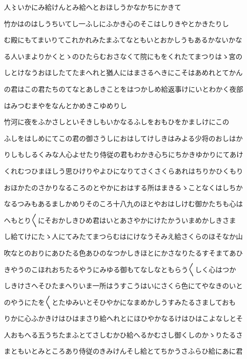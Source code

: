 \documentclass[a4paper,11pt,landscape]{ltjtarticle}
\begin{document}
人〻いかにみ給けんとみ給へとおほしうかなかちにかきて
\par\medskip
竹かはのはしうちいてし一ふしにふかき心のそこはしりきやとかきたりし
\par\medskip
む殿にもてまいりてこれかれみたまふてなともいとおかしうもあるかないかな
\par\medskip
る人いまよりかくとゝのひたらむおさなくて院にもをくれたてまつりはゝ宮の
\par\medskip
しとけなうおほしたてたまへれと猶人にはまさるへきにこそはあめれとてかん
\par\medskip
の君はこの君たちのてなとあしきことをはつかしめ給返事けにいとわかく夜部
\par\medskip
はみつむまやをなんとかめきこゆめりし
\par\medskip
竹河に夜をふかさしといそきしもいかなるふしをおもひをかましけにこの
\par\medskip
ふしをはしめにてこの君の御さうしにおはしてけしきはみよる少将のおしはか
\par\medskip
りしもしるくみな人心よせたり侍従の君もわかき心ちにちかきゆかりにてあけ
\par\medskip
くれむつひまほしう思ひけりやよひになりてさくさくらあれはちりかひくもり
\par\medskip
おほかたのさかりなるころのとやかにおはする所はまきるゝことなくはしちか
\par\medskip
なるつみもあるましかめりそのころ十八九のほとやおはしけむ御かたちも心は
\par\medskip
へもとり〱にそおかしきひめ君はいとあさやかにけたかういまめかしきさま
\par\medskip
し給てけにたゝ人にてみたてまつらむはにけなうそみえ給さくらのほそなか山
\par\medskip
吹なとのおりにあひたる色あひのなつかしきほとにかさなりたるすそまてあひ
\par\medskip
きやうのこほれおちたるやうにみゆる御もてなしなともらう〱しく心はつか
\par\medskip
しきけさへそひたまへりいま一所はうすこうはいにさくら色にてやなきのいと
\par\medskip
のやうにたを〱とたゆみいとそひやかになまめかしうすみたるさましておも
\par\medskip
りかに心ふかきけはひはまさり給へれとにほひやかなるけはひはこよなしとそ
\par\medskip
人おもへる五うちたまふとてさしむかひ給へるかむさし御くしのかゝりたるさ
\par\medskip
まともいとみところあり侍従のきみけんそし給とてちかうさふらひ給にあに君
\end{document}
